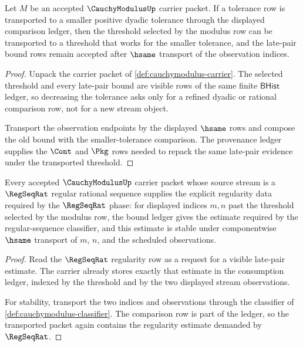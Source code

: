 \begin{theorem}
\label{thm:cauchymodulus-monotone-tail-obligation}
Let $M$ be an accepted $\CauchyModulusUp$ carrier packet. If a tolerance row is
transported to a smaller positive dyadic tolerance through the displayed
comparison ledger, then the threshold selected by the modulus row can be
transported to a threshold that works for the smaller tolerance, and the
late-pair bound rows remain accepted after $\hsame$ transport of the
observation indices.
\end{theorem}
\begin{proof}
Unpack the carrier packet of \autoref{def:cauchymodulus-carrier}. The selected
threshold and every late-pair bound are visible rows of the same finite
$\mathsf{BHist}$ ledger, so decreasing the tolerance asks only for a refined
dyadic or rational comparison row, not for a new stream object.

Transport the observation endpoints by the displayed $\hsame$ rows and compose
the old bound with the smaller-tolerance comparison. The provenance ledger
supplies the $\Cont$ and $\Pkg$ rows needed to repack the same late-pair
evidence under the transported threshold.
\end{proof}

\begin{theorem}
\label{thm:cauchymodulus-regseqrat-regularity-obligation}
Every accepted $\CauchyModulusUp$ carrier packet whose source stream is a
$\RegSeqRat$ regular rational sequence supplies the explicit regularity data
required by the $\RegSeqRat$ phase: for displayed indices $m,n$ past the
threshold selected by the modulus row, the bound ledger gives the estimate
required by the regular-sequence classifier, and this estimate is stable under
componentwise $\hsame$ transport of $m$, $n$, and the scheduled observations.
\end{theorem}
\begin{proof}
Read the $\RegSeqRat$ regularity row as a request for a visible late-pair
estimate. The carrier already stores exactly that estimate in the consumption
ledger, indexed by the threshold and by the two displayed stream observations.

For stability, transport the two indices and observations through the
classifier of \autoref{def:cauchymodulus-classifier}. The comparison row is
part of the ledger, so the transported packet again contains the regularity
estimate demanded by $\RegSeqRat$.
\end{proof}

